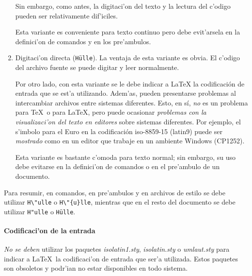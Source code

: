 \documentclass[11pt,a4paper,pagesize,tablecaptionabove,abstracton,pointlessnumbers]{scrartcl}
\newcommand{\gl}{\guillemotleft}
\newcommand{\gr}{\guillemotright}
\newcommand{\Paket}[1]{\textsf{\textsl{#1.sty}}\xspace}
\begin{document}
\begin{enumerate}
  Sin embargo, como antes, la digitaci'on del texto y la lectura del c'odigo pueden ser relativamente dif'iciles.

  Esta variante es conveniente para texto continuo pero debe evit'arsela en la definici'on de comandos y en los pre'ambulos.

  \item Digitaci'on directa (\verb+Hülle+). La ventaja de esta variante es obvia. El c'odigo del archivo fuente se puede digitar y leer \gl normalmente\gr.
  
  Por otro lado, con esta variante se le debe indicar a \LaTeX{} la codificación de entrada que se est'a utilizando. Adem'as, pueden presentarse problemas al intercambiar archivos entre sistemas diferentes. Esto, en sí, \emph{no} es un problema para \TeX\ o para \LaTeX{}, pero puede ocasionar \emph{problemas con la visualizaci'on del texto en editores} sobre sistemas diferentes. Por ejemplo, el s'imbolo para el Euro en la codificación iso-8859-15 (latin9) puede ser \emph{mostrado} como {\selectfont\textcurrency} en un editor que trabaje en un ambiente Windows (CP1252).

  Esta variante es bastante c'omoda para texto normal; sin embargo, su uso debe evitarse en la definici'on de comandos o en el pre'ambulo de un documento.
\end{enumerate}
%
Para resumir, en comandos, en pre'ambulos y en archivos de estilo se debe utilizar
\verb+H\"ulle+ o \verb+H\"{u}lle+, mientras que en el resto del documento se debe utilizar \verb+H"ulle+ o \verb+Hülle+.

\paragraph{Codificaci'on de la entrada}
\label{sec:eingabekodierung-1}

\emph{No se deben} utilizar los paquetes \Paket{isolatin1}, \Paket{isolatin} o \Paket{umlaut} para indicar a \LaTeX\ la codificaci'on de entrada que ser'a utilizada. Estos paquetes son obsoletos y podr'ian no estar disponibles en todo sistema.
\end{document}
